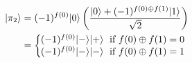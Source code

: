 \documentclass[preview]{standalone}
\begin{document}
\begin{align*}
|\pi_2\rangle &= (-1)^{f(0)}|0\rangle \left( \frac{|0\rangle + (-1)^{f(0)\oplus f(1)} |1\rangle}{\sqrt{2}}\right) \\ &=  \left\{ \begin{array}{ll} \hspace{-2mm} (-1)^{f(0)} |-\rangle |+\rangle  \; \text{ if } f(0) \oplus f(1) = 0 \\ \hspace{-2mm} (-1)^{f(0)} |-\rangle |-\rangle  \; \text{ if } f(0) \oplus f(1) = 1 \end{array} \right.
\end{align*}
\end{document}
